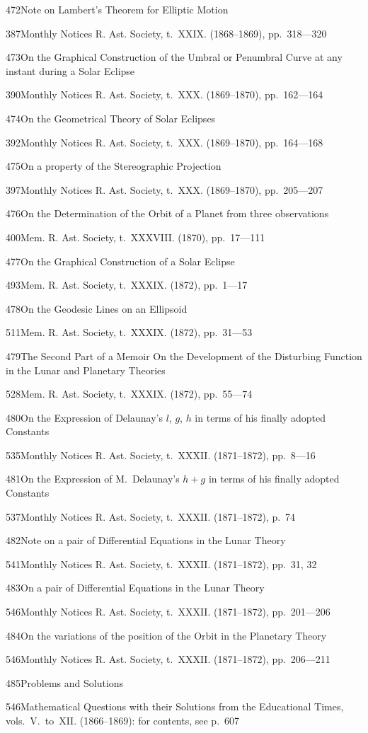 \documentclass[11pt,a4paper]{book}
\providecommand{\tocentry}[2]{#1\dotfill #2\par}
\begin{document}
\tocentry{472}{Note on Lambert's Theorem for Elliptic Motion}{387}{Monthly Notices R. Ast. Society, t.~XXIX. (1868--1869), pp.~318---320}

\newpage

\tocentry{473}{On the Graphical Construction of the Umbral or Penumbral Curve at any instant during a Solar Eclipse}{390}{Monthly Notices R. Ast. Society, t.~XXX. (1869--1870), pp.~162---164}

\tocentry{474}{On the Geometrical Theory of Solar Eclipses}{392}{Monthly Notices R. Ast. Society, t.~XXX. (1869--1870), pp.~164---168}

\tocentry{475}{On a property of the Stereographic Projection}{397}{Monthly Notices R. Ast. Society, t.~XXX. (1869--1870), pp.~205---207}

\tocentry{476}{On the Determination of the Orbit of a Planet from three observations}{400}{Mem. R. Ast. Society, t.~XXXVIII. (1870), pp.~17---111}

\tocentry{477}{On the Graphical Construction of a Solar Eclipse}{493}{Mem. R. Ast. Society, t.~XXXIX. (1872), pp.~1---17}

\tocentry{478}{On the Geodesic Lines on an Ellipsoid}{511}{Mem. R. Ast. Society, t.~XXXIX. (1872), pp.~31---53}

\tocentry{479}{The Second Part of a Memoir On the Development of the Disturbing Function in the Lunar and Planetary Theories}{528}{Mem. R. Ast. Society, t.~XXXIX. (1872), pp.~55---74}

\tocentry{480}{On the Expression of Delaunay's $l$, $g$, $h$ in terms of his finally adopted Constants}{535}{Monthly Notices R. Ast. Society, t.~XXXII. (1871--1872), pp.~8---16}

\tocentry{481}{On the Expression of M.~Delaunay's $h + g$ in terms of his finally adopted Constants}{537}{Monthly Notices R. Ast. Society, t.~XXXII. (1871--1872), p.~74}

\tocentry{482}{Note on a pair of Differential Equations in the Lunar Theory}{541}{Monthly Notices R. Ast. Society, t.~XXXII. (1871--1872), pp.~31, 32}

\tocentry{483}{On a pair of Differential Equations in the Lunar Theory}{546}{Monthly Notices R. Ast. Society, t.~XXXII. (1871--1872), pp.~201---206}

\tocentry{484}{On the variations of the position of the Orbit in the Planetary Theory}{546}{Monthly Notices R. Ast. Society, t.~XXXII. (1871--1872), pp.~206---211}

\tocentry{485}{Problems and Solutions}{546}{Mathematical Questions with their Solutions from the Educational Times, vols.~V.~to~XII. (1866--1869): for contents, see p.~607}
\end{document}
